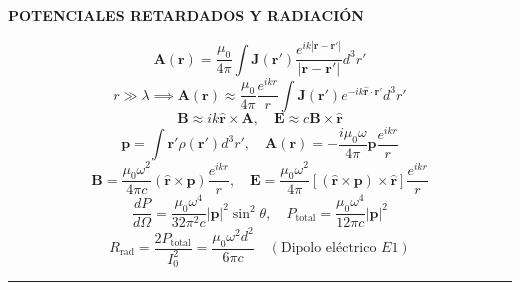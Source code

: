 \documentclass[twocolumn]{article}
\begin{document}
	\begin{center}\textbf{\footnotesize POTENCIALES RETARDADOS Y RADIACIÓN}\end{center}
	\vspace{-2mm}
	\begin{equation*}
		\mathbf{A}(\mathbf{r}) = \frac{\mu_0}{4\pi}\int \mathbf{J}(\mathbf{r}')\frac{e^{ik|\mathbf{r}-\mathbf{r}'|}}{|\mathbf{r}-\mathbf{r}'|} d^3r'
	\end{equation*}
	\begin{equation*}
		r \gg \lambda \implies \mathbf{A}(\mathbf{r}) \approx \frac{\mu_0}{4\pi}\frac{e^{ikr}}{r}\int \mathbf{J}(\mathbf{r}')e^{-ik\hat{\mathbf{r}}\cdot\mathbf{r}'}d^3r'
	\end{equation*}
	\begin{equation*}
		\mathbf{B} \approx ik\hat{\mathbf{r}}\times\mathbf{A}, \quad \mathbf{E} \approx c\mathbf{B}\times\hat{\mathbf{r}}
	\end{equation*}
	\begin{equation*}
		\mathbf{p} = \int \mathbf{r}'\rho(\mathbf{r}')d^3r', \quad \mathbf{A}(\mathbf{r}) = - \frac{i\mu_0\omega}{4\pi}\mathbf{p}\frac{e^{ikr}}{r}
	\end{equation*}
	\begin{equation*}
		\mathbf{B} = \frac{\mu_0\omega^2}{4\pi c}(\hat{\mathbf{r}}\times\mathbf{p})\frac{e^{ikr}}{r}, \quad \mathbf{E} = \frac{\mu_0\omega^2}{4\pi}\left[(\hat{\mathbf{r}}\times\mathbf{p})\times\hat{\mathbf{r}}\right]\frac{e^{ikr}}{r}
	\end{equation*}
	\begin{equation*}
		\frac{dP}{d\Omega} = \frac{\mu_0\omega^4}{32\pi^2 c}|\mathbf{p}|^2\sin^2\theta, \quad P_{\text{total}} = \frac{\mu_0\omega^4}{12\pi c}|\mathbf{p}|^2
	\end{equation*}
	\begin{equation*}
		R_{\text{rad}} = \frac{2 P_{\text{total}}}{I_0^2} = \frac{\mu_0\omega^2 d^2}{6\pi c} \quad (\text{Dipolo eléctrico } E1)
	\end{equation*}
	
	\vspace{-2mm}\hrule\vspace{1mm}
	
\end{document}
